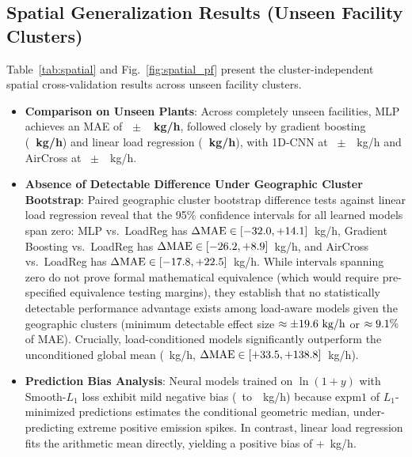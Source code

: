 \documentclass[conference]{IEEEtran}
\begin{document}
\subsection{Spatial Generalization Results (Unseen Facility Clusters)}
Table~\ref{tab:spatial} and Fig.~\ref{fig:spatial_pf} present the cluster-independent spatial cross-validation results across unseen facility clusters.
\begin{itemize}
    \item \textbf{Comparison on Unseen Plants}: Across completely unseen facilities, MLP achieves an MAE of \textbf{\SpatMLPMAE~$\pm$~\SpatMLPMAEsd~kg/h}, followed closely by gradient boosting (\textbf{\SpatGBMAE~kg/h}) and linear load regression (\textbf{\SpatLoadRegMAE~kg/h}), with 1D-CNN at \SpatCNNMAE~$\pm$~\SpatCNNMAEsd~kg/h and AirCross at \SpatAirCrossMAE~$\pm$~\SpatAirCrossMAEsd~kg/h.
    \item \textbf{Absence of Detectable Difference Under Geographic Cluster Bootstrap}: Paired geographic cluster bootstrap difference tests against linear load regression reveal that the 95\% confidence intervals for all learned models span zero: MLP vs.\ LoadReg has $\Delta\text{MAE} \in [-32.0, +14.1]$~kg/h, Gradient Boosting vs.\ LoadReg has $\Delta\text{MAE} \in [-26.2, +8.9]$~kg/h, and AirCross vs.\ LoadReg has $\Delta\text{MAE} \in [-17.8, +22.5]$~kg/h. While intervals spanning zero do not prove formal mathematical equivalence (which would require pre-specified equivalence testing margins), they establish that no statistically detectable performance advantage exists among load-aware models given the \NClusters{} geographic clusters (minimum detectable effect size $\approx \pm 19.6\text{ kg/h}$ or $\approx 9.1\%$ of MAE). Crucially, load-conditioned models significantly outperform the unconditioned global mean (\SpatGlobalMeanMAE~kg/h, $\Delta\text{MAE} \in [+33.5, +138.8]$~kg/h).
    \item \textbf{Prediction Bias Analysis}: Neural models trained on $\ln(1+y)$ with Smooth-$L_1$ loss exhibit mild negative bias (\SpatCNNBias~to~\SpatMLPBias~kg/h) because $\text{expm1}$ of $L_1$-minimized predictions estimates the conditional geometric median, under-predicting extreme positive emission spikes. In contrast, linear load regression fits the arithmetic mean directly, yielding a positive bias of +\SpatLoadRegBias~kg/h.
\end{itemize}
\end{document}

